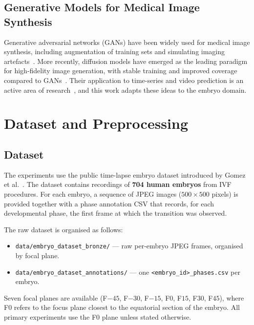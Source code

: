 \documentclass[12pt, a4paper, twoside]{report}
\begin{document}
\section{Generative Models for Medical Image Synthesis}
\label{sec:related_generative}

Generative adversarial networks (GANs) have been widely used for medical image
synthesis, including augmentation of training sets and simulating imaging
artefacts~\cite{yi2019review}.
More recently, diffusion models have emerged as the leading paradigm for
high-fidelity image generation, with stable training and improved coverage
compared to GANs~\cite{dhariwal2021beatgans,ho2020ddpm}.
Their application to time-series and video prediction is an active area of
research~\cite{ho2022video,harvey2022flexible}, and this work adapts these
ideas to the embryo domain.

\chapter{Dataset and Preprocessing}
\label{chap:dataset}

\section{Dataset}
\label{sec:dataset}

The experiments use the public time-lapse embryo dataset introduced by
Gomez et al.~\cite{gomez2022}.
The dataset contains recordings of \textbf{704 human embryos} from IVF
procedures.
For each embryo, a sequence of JPEG images ($500 \times 500$ pixels) is
provided together with a phase annotation CSV that records, for each
developmental phase, the first frame at which the transition was observed.

The raw dataset is organised as follows:
\begin{itemize}
  \item \texttt{data/embryo\_dataset\_bronze/} — raw per-embryo JPEG frames,
        organised by focal plane.
  \item \texttt{data/embryo\_dataset\_annotations/} — one
        \texttt{<embryo\_id>\_phases.csv} per embryo.
\end{itemize}

Seven focal planes are available (F$-45$, F$-30$, F$-15$, F$0$, F$15$, F$30$,
F$45$), where F$0$ refers to the focus plane closest to the equatorial section
of the embryo.
All primary experiments use the F$0$ plane unless stated otherwise.
\end{document}
